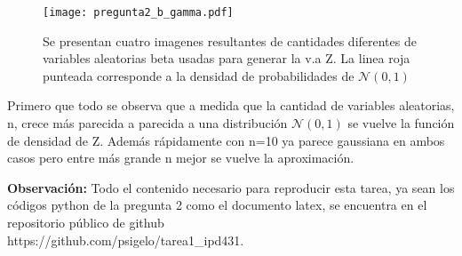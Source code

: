 			\begin{figure}[H]
			    \centering
			    \texttt{[image: pregunta2\_b\_gamma.pdf]}
			    \caption{Se presentan cuatro imagenes resultantes de cantidades diferentes de variables aleatorias beta usadas para generar la v.a Z. La linea roja punteada corresponde a la densidad de probabilidades de $\mathcal{ N } (0, 1)$}
			    \label{fig:2_b_gamma}
			\end{figure}

			Primero que todo se observa que a medida que la cantidad de variables aleatorias, n, crece más parecida a parecida a una distribución $\mathcal{ N } (0, 1)$ se vuelve la función de densidad de Z. Además rápidamente con n=10 ya parece gaussiana en ambos casos pero entre más grande n mejor se vuelve la aproximación. \newline

			\textbf{Observación:} {\color{red} Todo el contenido necesario para reproducir esta tarea, ya sean los códigos python de la pregunta 2 como el documento latex, se encuentra en el repositorio público de github} \\ 


			https://github.com/psigelo/tarea1\_ipd431.